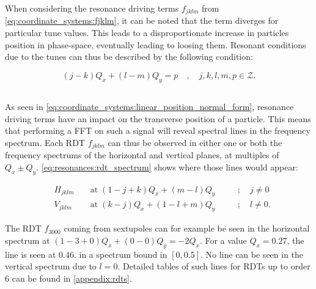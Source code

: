 

When considering the resonance driving terms $f_{jklm}$ from \cref{eq:coordinate_systems:fjklm}, it
can be noted that the term diverges for particular tune values. This leads to a disproportionate
increase in particles position in phase-space, eventually leading to loosing them.
Resonant conditions due to the tunes can thus be described by the following condition:

\begin{equation}
    (j-k)Q_x + (l-m)Q_y = p \quad,\quad j,k,l,m,p \in \mathcal{Z}.
\end{equation}
    


\subsection{}

As seen in \cref{eq:coordinate_systems:linear_position_normal_form}, resonance driving terms have an
impact on the transverse position of a particle. This means that performing a FFT on such a signal
will reveal spectral lines in the frequency spectrum.
Each RDT $f_{jklm}$ can thus be observed in either one or both the frequency spectrums of the
horizontal and vertical planes, at multiples of $Q_x \pm Q_y$. \cref{eq:resonances:rdt_spectrum}
shows where those lines would appear:

\begin{equation}
    \begin{aligned}
    & H_{jklm} \;&&\text{at}\; (1 - j + k)Q_x + (m - l)Q_y \quad&&; \quad j \ne 0 \\
    & V_{jklm}   &&\text{at}\; (k - j)Q_x + (1 - l + m)Q_y      &&; \quad l \ne 0.
    \end{aligned}
    \label{eq:resonances:rdt_spectrum}
\end{equation}

The RDT $f_{3000}$ coming from sextupoles can for example be seen in the horizontal spectrum at
$(1-3+0)Q_x + (0-0)Q_y = -2Q_x$. For a value $Q_x = 0.27$, the line is seen at $0.46$. in a spectrum
bound in $[0, 0.5]$. No line can be seen in the vertical spectrum due to $l = 0$.
Detailed tables of such lines for RDTs up to order 6 can be found in \cref{appendix:rdts}.

